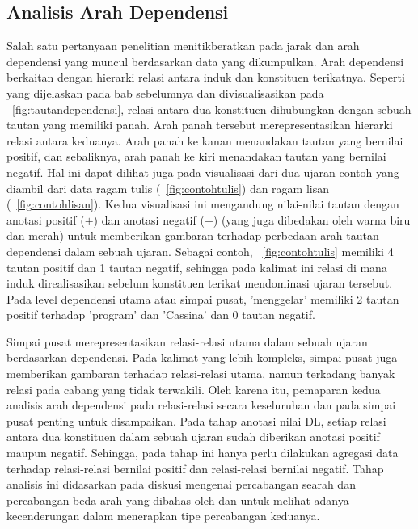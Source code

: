 \subsection{Analisis Arah Dependensi}
Salah satu pertanyaan penelitian menitikberatkan pada jarak dan arah dependensi yang muncul berdasarkan data yang dikumpulkan. Arah dependensi berkaitan dengan hierarki relasi antara induk dan konstituen terikatnya. Seperti yang dijelaskan pada bab sebelumnya dan divisualisasikan pada \pic~\ref{fig:tautandependensi}, relasi antara dua konstituen dihubungkan dengan sebuah tautan yang memiliki panah. Arah panah tersebut merepresentasikan hierarki relasi antara keduanya. Arah panah ke kanan menandakan tautan yang bernilai positif, dan sebaliknya, arah panah ke kiri menandakan tautan yang bernilai negatif. Hal ini dapat dilihat juga pada visualisasi dari dua ujaran contoh yang diambil dari data ragam tulis (\pic~\ref{fig:contohtulis}) dan ragam lisan (\pic~\ref{fig:contohlisan}). Kedua visualisasi ini mengandung nilai-nilai tautan dengan anotasi positif ($+$) dan anotasi negatif ($-$) (yang juga dibedakan oleh warna biru dan merah) untuk memberikan gambaran terhadap perbedaan arah tautan dependensi dalam sebuah ujaran. Sebagai contoh, \pic~\ref{fig:contohtulis} memiliki 4 tautan positif dan 1 tautan negatif, sehingga pada kalimat ini relasi di mana induk direalisasikan sebelum konstituen terikat mendominasi ujaran tersebut. Pada level dependensi utama atau simpai pusat, 'menggelar' memiliki 2 tautan positif terhadap 'program' dan 'Cassina' dan 0 tautan negatif.

Simpai pusat merepresentasikan relasi-relasi utama dalam sebuah ujaran berdasarkan dependensi. Pada kalimat yang lebih kompleks, simpai pusat juga memberikan gambaran terhadap relasi-relasi utama, namun terkadang banyak relasi pada cabang yang tidak terwakili. Oleh karena itu, pemaparan kedua analisis arah dependensi pada relasi-relasi secara keseluruhan dan pada simpai pusat penting untuk disampaikan. Pada tahap anotasi nilai DL, setiap relasi antara dua konstituen dalam sebuah ujaran sudah diberikan anotasi positif maupun negatif. Sehingga, pada tahap ini hanya perlu dilakukan agregasi data terhadap relasi-relasi bernilai positif dan relasi-relasi bernilai negatif. Tahap analisis ini didasarkan pada diskusi mengenai percabangan searah dan percabangan beda arah yang dibahas oleh \cite{temperley2008dependency} dan \cite{dryer1992greenbergian} untuk melihat adanya kecenderungan dalam menerapkan tipe percabangan keduanya.

